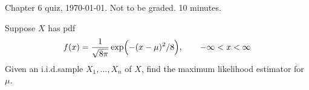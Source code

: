\documentclass[12pt]{article}
\begin{document}
\thispagestyle{empty}

Chapter 6 quiz, \today. Not to be graded. 10 minutes.
\bigskip

Suppose $X$ has pdf
\[
f(x) = \frac{1}{\sqrt{8\pi}}\exp\Bigl(-(x-\mu)^2/8\Bigr),
\qquad
-\infty < x < \infty
\]
Given an i.i.d.\@ sample
$X_1,\dotsc,X_n$ of $X$,
find the maximum likelihood estimator for $\mu$.
\end{document}
